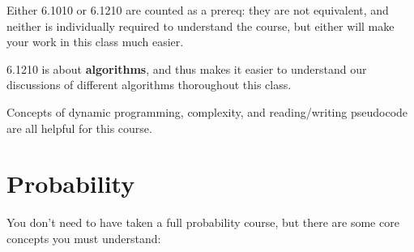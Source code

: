     Either 6.1010 or 6.1210 are counted as a prereq: they are not equivalent, and neither is individually required to understand the course, but either will make your work in this class much easier.
    
    6.1210 is about \textbf{algorithms}, and thus makes it easier to understand our discussions of different algorithms thoroughout this class.
    
    Concepts of dynamic programming, complexity, and reading/writing pseudocode are all helpful for this course.

\section{Probability}

    You don't need to have taken a full probability course, but there are some core concepts you must understand:
    
